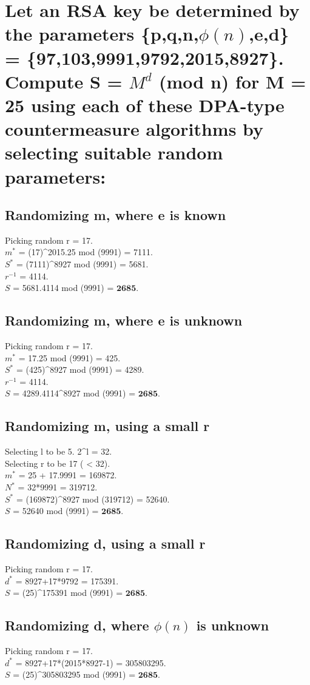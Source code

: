 \documentclass[11pt, pdftex]{article}
\begin{document}
\section{Let an RSA key be determined by the parameters \{p,q,n,$\phi(n)$,e,d\} = \{97,103,9991,9792,2015,8927\}. Compute S = $M^{d}$ (mod n) for M = 25 using each of these DPA-type countermeasure algorithms by selecting suitable random parameters:}
\subsection{Randomizing m, where e is known}
Picking random r = 17.\\
$m^{*}$ = (17)^{2015}.25 mod (9991) = 7111.\\
$S^{*}$ = (7111)^{8927} mod (9991) = 5681. \\
$r^{-1}$ = 4114.\\
$S$ = 5681.4114 mod (9991) = $\textbf{2685}$.
\subsection{Randomizing m, where e is unknown}
Picking random r = 17.\\
$m^{*}$ = 17.25 mod (9991) = 425.\\
$S^{*}$ = (425)^{8927} mod (9991) = 4289. \\
$r^{-1}$ = 4114.\\
$S$ = 4289.4114^{8927} mod (9991) = $\textbf{2685}$.
\subsection{Randomizing m, using a small r}
Selecting l to be 5. 2^{l} = 32.\\
Selecting r to be 17 ( < 32).\\
$m^{*}$ = 25 + 17.9991 = 169872.\\
$N^{*}$ = 32*9991 = 319712.\\
$S^{*}$ = (169872)^{8927} mod (319712) = 52640. \\
$S$ = 52640 mod (9991) = $\textbf{2685}$.
\subsection{Randomizing d, using a small r}
Picking random r = 17.\\
$d^{*}$ = 8927+17*9792 = 175391.\\
$S$ = (25)^{175391} mod (9991) = $\textbf{2685}$. 
\subsection{Randomizing d, where $\phi(n)$ is unknown}
Picking random r = 17.\\
$d^{*}$ = 8927+17*(2015*8927-1) = 305803295.\\
$S$ = (25)^{305803295} mod (9991) = $\textbf{2685}$. 
\end{document}
